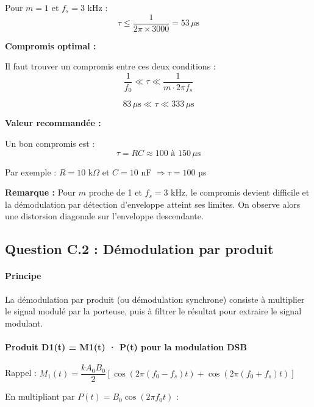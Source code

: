 \documentclass[11pt,a4paper]{article}
\begin{document}
Pour $m = 1$ et $f_s = 3$ kHz :
\begin{equation}
\tau \leq \frac{1}{2\pi \times 3000} = 53 \, \mu\text{s}
\end{equation}

\textbf{Compromis optimal :}

Il faut trouver un compromis entre ces deux conditions :
\begin{equation}
\boxed{\frac{1}{f_0} \ll \tau \ll \frac{1}{m \cdot 2\pi f_s}}
\end{equation}

\begin{equation}
83 \, \mu\text{s} \ll \tau \ll 333 \, \mu\text{s}
\end{equation}

\textbf{Valeur recommandée :}

Un bon compromis est :
\begin{equation}
\boxed{\tau = RC \approx 100 \text{ à } 150 \, \mu\text{s}}
\end{equation}

Par exemple : $R = 10$ k$\Omega$ et $C = 10$ nF $\Rightarrow \tau = 100$ µs

\textbf{Remarque :} Pour $m$ proche de 1 et $f_s = 3$ kHz, le compromis devient difficile et la démodulation par détection d'enveloppe atteint ses limites. On observe alors une distorsion diagonale sur l'enveloppe descendante.

\subsection{Question C.2 : Démodulation par produit}

\paragraph{Principe}

La démodulation par produit (ou démodulation synchrone) consiste à multiplier le signal modulé par la porteuse, puis à filtrer le résultat pour extraire le signal modulant.

\paragraph{Produit D1(t) = M1(t) · P(t) pour la modulation DSB}

Rappel : $M_1(t) = \dfrac{k A_0 B_0}{2}[\cos(2\pi(f_0-f_s)t) + \cos(2\pi(f_0+f_s)t)]$

En multipliant par $P(t) = B_0 \cos(2\pi f_0 t)$ :
\end{document}
